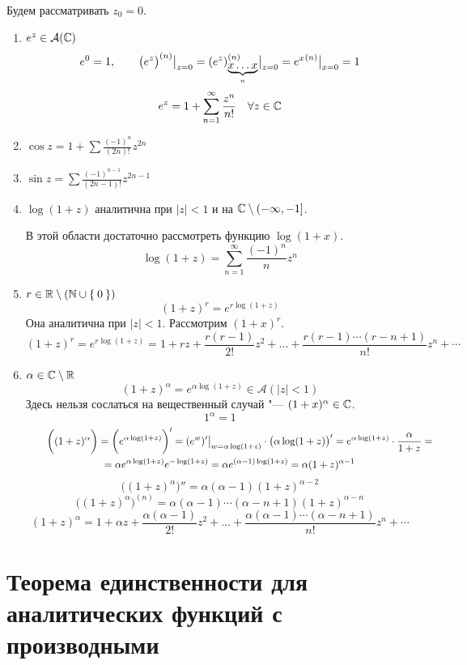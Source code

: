 Будем рассматривать $ z_0 = 0 $.
\begin{enumerate}
	\item $ e^z \in \mathcal A(\mathbb{C}) $
	$$ e^0 = 1, \qquad {\big(e^z \big)}^{({n})}\big|_{z = 0}^{} = {(e^z)}^{({n})}_{\underbrace{x\dots x}_n}\big|_{z = 0}^{} = {e^x}^{({n})}\big|_{x = 0}^{} = 1 $$
	$$ e^z = 1 + \sum_{n = 1}^\infty \frac{z^n}{n!} \quad \forall z \in \mathbb{C} $$
	\item $ \cos z = 1 + \sum \frac{(-1)^n}{(2n)!} z^{2n} $
	\item $ \sin z = \sum \frac{(-1)^{n - 1}}{(2n - 1)!} z^{2n - 1} $
	\item $ \log (1 + z) $ аналитична при $ |z| < 1 $ и на $ \mathbb{C} \setminus (-\infty, -1] $.

	В этой области достаточно рассмотреть функцию $ \log (1 + x) $.
	$$ \log(1 + z) = \sum_{n = 1}^\infty \frac{(-1)^n}{n}z^n $$
	\item $ r \in \mathbb{R} \setminus (\mathbb{N} \cup \Set 0) $
	$$ (1 + z)^r = e^{r \log(1 + z)} $$
	Она аналитична при $ |z| < 1 $. Рассмотрим $ (1 + x)^r $.
	$$ (1 + z)^r = e^{r \log(1 + z)} = 1 + rz + \frac{r(r - 1)}{2!}z^2 + \dots + \frac{r(r - 1) \cdots (r - n + 1)}{n!} z^n + \cdots $$
	\item $ \alpha \in \mathbb{C} \setminus \mathbb{R} $
	$$ (1 + z)^\alpha = e^{\alpha \log(1 + z)} \in \mathcal A(|z| < 1) $$
	Здесь нельзя сослаться на вещественный случай "--- $ (1 + x)^\alpha \in \mathbb{C} $.
	$$ 1^\alpha = 1 $$
	\begin{multline*}
		\qquad \bigg( (1 + z)^\alpha \bigg) = \bigg( e^{\alpha \log(1 + z)} \bigg)' = (e^w)'\big|_{w = \alpha \log(1 + z)}^{} \cdot \big( \alpha \log(1 + z) \big)' = e^{\alpha \log(1 + z)} \cdot \frac\alpha{1 + z} = \\
		= \alpha e^{\alpha \log(1 + z)} e^{-\log(1 + z)} = \alpha e^{(\alpha - 1) \log(1 + z)} = \alpha(1 + z)^{\alpha - 1}
	\end{multline*}
	$$ \bigg( (1 + z)^\alpha \bigg)'' = \alpha(\alpha - 1)(1 + z)^{\alpha - 2} $$
	$$ \bigg( (1 + z)^\alpha \bigg)^{(n)} = \alpha(\alpha - 1) \cdots (\alpha - n + 1)(1 + z)^{\alpha - n} $$
	$$ (1 + z)^\alpha = 1 + \alpha z + \frac{\alpha(\alpha - 1)}{2!} z^2 + \dots + \frac{\alpha(\alpha - 1) \cdots (\alpha - n + 1)}{n!} z^n + \cdots $$
\end{enumerate}

\section{Теорема единственности для аналитических функций с производными}

